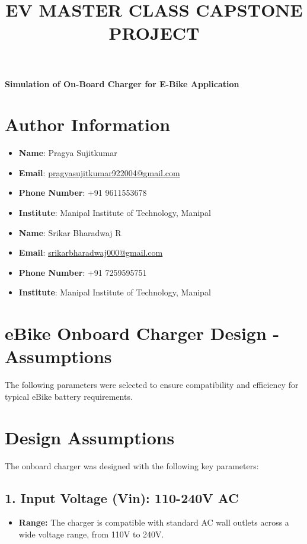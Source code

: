 \documentclass[12pt]{article}
\title{\textbf{EV MASTER CLASS CAPSTONE PROJECT}}
\author{}
\date{}
\begin{document}
\maketitle

\begin{center}
    \Large \textbf{Simulation of On-Board Charger for E-Bike Application}
\end{center}

\section*{Author Information}
\begin{itemize}
    \item \textbf{Name}: Pragya Sujitkumar
    \item \textbf{Email}: \href{mailto:pragyasujitkumar922004@gmail.com}{pragyasujitkumar922004@gmail.com}
    \item \textbf{Phone Number}: +91 9611553678
    \item \textbf{Institute}: Manipal Institute of Technology, Manipal
    \\
    \item \textbf{Name}: Srikar Bharadwaj R
    \item \textbf{Email}: \href{mailto:srikarbharadwaj000@gmail.com}{srikarbharadwaj000@gmail.com}
    \item \textbf{Phone Number}: +91 7259595751
    \item \textbf{Institute}: Manipal Institute of Technology, Manipal
\end{itemize}

\newpage

\section*{eBike Onboard Charger Design - Assumptions}

The following parameters were selected to ensure compatibility and efficiency for typical eBike battery requirements.

\section*{Design Assumptions}
The onboard charger was designed with the following key parameters:

\subsection*{1. Input Voltage (Vin): 110-240V AC}
\begin{itemize}
    \item \textbf{Range:} The charger is compatible with standard AC wall outlets across a wide voltage range, from 110V to 240V.
\end{itemize}
\end{document}
